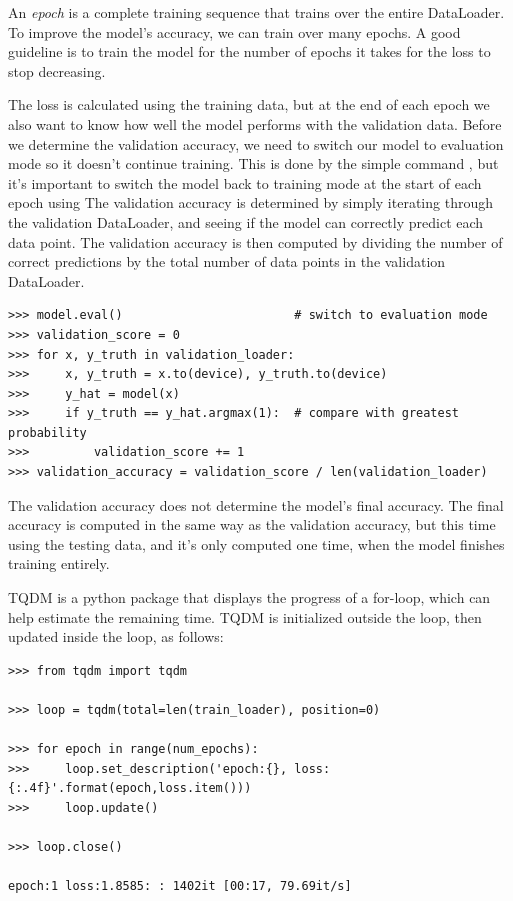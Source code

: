 An \emph{epoch} is a complete training sequence that trains over the entire DataLoader.
To improve the model's accuracy, we can train over many epochs.
A good guideline is to train the model for the number of epochs it takes for the loss to stop decreasing. 

The loss is calculated using the training data, but at the end of each epoch we also want to know how well the model performs with the validation data.
Before we determine the validation accuracy, we need to switch our model to evaluation mode so it doesn't continue training.
This is done by the simple command , but it's important to switch the model back to training mode at the start of each epoch using 
The validation accuracy is determined by simply iterating through the validation DataLoader, and seeing if the model can correctly predict each data point.
The validation accuracy is then computed by dividing the number of correct predictions by the total number of data points in the validation DataLoader.
\begin{lstlisting}
>>> model.eval()                        # switch to evaluation mode
>>> validation_score = 0
>>> for x, y_truth in validation_loader:
>>>     x, y_truth = x.to(device), y_truth.to(device)
>>>     y_hat = model(x)
>>>     if y_truth == y_hat.argmax(1):  # compare with greatest probability
>>>         validation_score += 1
>>> validation_accuracy = validation_score / len(validation_loader)
\end{lstlisting}
The validation accuracy does not determine the model's final accuracy.
The final accuracy is computed in the same way as the validation accuracy, but this time using the testing data, and it's only computed one time, when the model finishes training entirely.

TQDM is a python package that displays the progress of a for-loop, which can help estimate the remaining time.
TQDM is initialized outside the loop, then updated inside the loop, as follows:

\begin{lstlisting}
>>> from tqdm import tqdm

>>> loop = tqdm(total=len(train_loader), position=0)

>>> for epoch in range(num_epochs):
>>>     loop.set_description('epoch:{}, loss:{:.4f}'.format(epoch,loss.item()))
>>>		loop.update()

>>> loop.close()

epoch:1 loss:1.8585: : 1402it [00:17, 79.69it/s]
\end{lstlisting}

